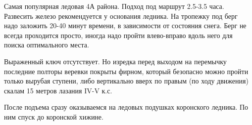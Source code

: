 Самая популярная ледовая 4А района. Подход под маршрут 2.5-3.5 часа.
Развесить железо рекомендуется у основания ледника. На тропежку под
берг надо заложить 20-40 минут времени, в зависимости от состояния
снега. Берг не всегда проходится просто, иногда надо пройти
влево-вправо вдоль него для поиска оптимального места.

Выраженный ключ отсутствует. Но изредка перед выходом на перемычку
последние полторы веревки покрыты фирном, который безопасно можно
пройти только вырубая ступени, либо вертикально вверх по правым (по
ходу движения) скалам 15 метров лазания IV-V к.с.

После подъема сразу оказываемся на ледовых подушках коронского
ледника. По ним спуск до коронской хижине.

